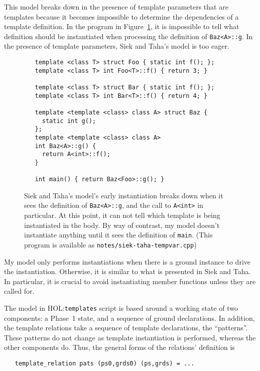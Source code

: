 \documentclass[11pt]{article}
\newcommand{\HOLfile}[1]{HOL:\texttt{#1}}
\begin{document}
This model breaks down in the presence of template parameters that are
templates because it becomes impossible to determine the dependencies
of a template definition.  In the program in
Figure~\ref{fig:taha-problem}, it is impossible to tell what
definition should be instantiated when processing the definition of
\texttt{Baz<A>::g}.  In the presence of template parameters, Siek and
Taha's model is too eager.

\begin{figure}
\begin{verbatim}
   template <class T> struct Foo { static int f(); };
   template <class T> int Foo<T>::f() { return 3; }

   template <class T> struct Bar { static int f(); };
   template <class T> int Bar<T>::f() { return 4; }

   template <template <class> class A> struct Baz {
     static int g();
   };
   template <template <class> class A>
   int Baz<A>::g() {
     return A<int>::f();
   }

   int main() { return Baz<Foo>::g(); }
\end{verbatim}
  \caption[A Template Program that Breaks Siek and Taha's Model]{Siek
    and Taha's model's early instantiation breaks down when it sees
    the definition of \texttt{Baz<A>::g}, and the call to
    \texttt{A<int>} in particular.  At this point, it can not tell
    which template is being instantiated in the body.  By way of
    contrast, my model doesn't instantiate anything until it sees the
    definition of \texttt{main}.  (This program is available as
    \texttt{notes/siek-taha-tempvar.cpp})}
\label{fig:taha-problem}
\end{figure}

My model only performs instantiations when there is a ground instance
to drive the instantiation.  Otherwise, it is similar to what is
presented in Siek and Taha.  In particular, it is crucial to avoid
instantiating member functions unless they are called for.

The model in \HOLfile{templates} script is based around a working
state of two components: a Phase~1 state, and a sequence of ground
declarations.  In addition, the template relations take a sequence of
template declarations, the ``patterns''.  These patterns do not change
as template instantiation is performed, whereas the other components
do.  Thus, the general forms of the relations' definition is
\begin{verbatim}
   template_relation pats (ps0,grds0) (ps,grds) = ...
\end{verbatim}
\end{document}
